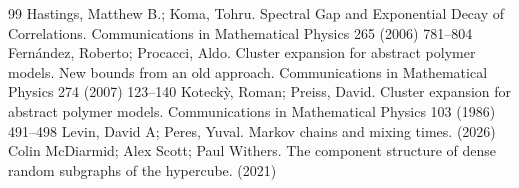 \documentclass[10pt,a4paper]{amsart}
\begin{document}
\begin{thebibliography}{99}
 Hastings, Matthew B.; Koma, Tohru. Spectral Gap and Exponential Decay of Correlations. Communications in Mathematical Physics 265 (2006) 781–804
 Fern{\'a}ndez, Roberto; Procacci, Aldo. Cluster expansion for abstract polymer models. New bounds from an old approach. Communications in Mathematical Physics 274 (2007) 123--140
 Koteck{\`y}, Roman; Preiss, David. Cluster expansion for abstract polymer models. Communications in Mathematical Physics 103 (1986) 491--498
 Levin, David A; Peres, Yuval. Markov chains and mixing times. (2026)
 Colin McDiarmid; Alex Scott; Paul Withers. The component structure of dense random subgraphs of the hypercube. (2021)
\end{thebibliography}
\end{document}
